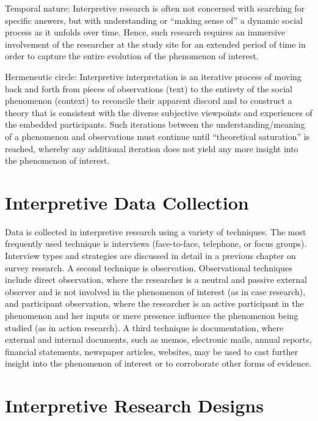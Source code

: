 Temporal nature: Interpretive research is often not concerned with searching for specific answers, but with understanding or “making sense of” a dynamic social process as it unfolds over time. Hence, such research requires an immersive involvement of the researcher at the study site for an extended period of time in order to capture the entire evolution of the phenomenon of interest.

Hermeneutic circle: Interpretive interpretation is an iterative process of moving back and forth from pieces of observations (text) to the entirety of the social phenomenon (context) to reconcile their apparent discord and to construct a theory that is consistent with the diverse subjective viewpoints and experiences of the embedded participants. Such iterations between the understanding/meaning of a phenomenon and observations must continue until “theoretical saturation” is reached, whereby any additional iteration does not yield any more insight into the phenomenon of interest.

\section{Interpretive Data Collection}

Data is collected in interpretive research using a variety of techniques. The most frequently used technique is interviews (face-to-face, telephone, or focus groups). Interview types and strategies are discussed in detail in a previous chapter on survey research. A second technique is observation. Observational techniques include direct observation, where the researcher is a neutral and passive external observer and is not involved in the phenomenon of interest (as in case research), and participant observation, where the researcher is an active participant in the phenomenon and her inputs or mere presence influence the phenomenon being studied (as in action research). A third technique is documentation, where external and internal documents, such as memos, electronic mails, annual reports, financial statements, newspaper articles, websites, may be used to cast further insight into the phenomenon of interest or to corroborate other forms of evidence.

\section{Interpretive Research Designs}

